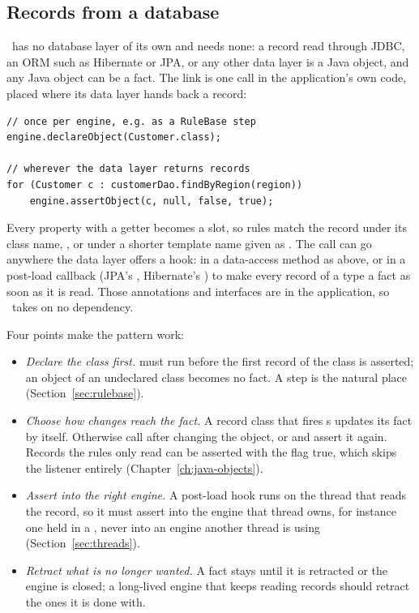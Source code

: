 \subsection{Records from a database}
\label{sec:records}

\Morendo\ has no database layer of its own and needs none: a record
read through JDBC, an ORM such as Hibernate or JPA, or any other data
layer is a Java object, and any Java object can be a fact. The link
is one call in the application's own code, placed where its data layer
hands back a record:

\begin{lstlisting}[style=java]
// once per engine, e.g. as a RuleBase step
engine.declareObject(Customer.class);

// wherever the data layer returns records
for (Customer c : customerDao.findByRegion(region))
    engine.assertObject(c, null, false, true);
\end{lstlisting}

Every property with a getter becomes a slot, so rules match the record
under its class name, ,
or under a shorter template name given as
. The call can go anywhere the data layer offers a
hook: in a data-access method as above, or in a post-load callback
(JPA's , Hibernate's ) to make
every record of a type a fact as soon as it is read. Those annotations
and interfaces are in the application, so \Morendo\ takes on no
dependency.

Four points make the pattern work:

\begin{itemize}
\item \emph{Declare the class first.}  must run before
  the first record of the class is asserted; an object of an undeclared
  class becomes no fact. A  step is the natural place
  (Section~\ref{sec:rulebase}).
\item \emph{Choose how changes reach the fact.} A record class that
  fires s updates its fact by itself. Otherwise
  call  after changing the object, or
   and assert it again. Records the rules only read
  can be asserted with the  flag true, which skips the
  listener entirely (Chapter~\ref{ch:java-objects}).
\item \emph{Assert into the right engine.} A post-load hook runs on the
  thread that reads the record, so it must assert into the engine that
  thread owns, for instance one held in a , never into
  an engine another thread is using (Section~\ref{sec:threads}).
\item \emph{Retract what is no longer wanted.} A fact stays until it is
  retracted or the engine is closed; a long-lived engine that keeps
  reading records should retract the ones it is done with.
\end{itemize}

